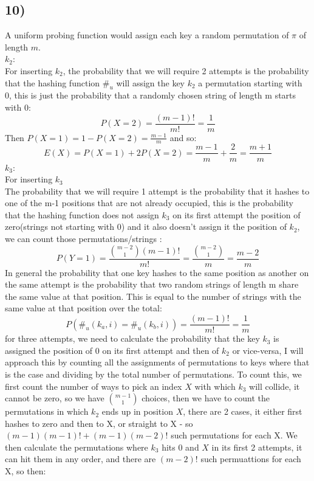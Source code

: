 \documentclass{report}
\begin{document}
\subsection*{10)}
A uniform probing function would assign each key a random permutation of $\pi$ of length $m$.\medskip\\
$k_{2}$:\\
For inserting $k_{2}$, the probability that we will require 2 attempts is the probability that the hashing function $\#_{u}$ will assign the key $k_{2}$ a permutation starting with 0, this is just the probability that a randomly chosen string of length m starts with 0:
\begin{equation*}
    P(X = 2) = \frac{(m-1)!}{m!} = \frac{1}{m}
\end{equation*}
Then $P(X = 1) = 1 - P(X = 2) = \frac{m-1}{m}$ and so:
\begin{equation*}
    E(X) = P(X=1) + 2P(X=2) = \frac{m-1}{m} + \frac{2}{m} = \frac{m+1}{m}
\end{equation*}
$k_{3}$:\\
For inserting $k_{3}$ \\
The probability that we will require 1 attempt is the probability that it hashes to one of the m-1 positions that are  not already occupied, this is the probability that the hashing function does not assign $k_{3}$ on its first attempt the position of zero(strings not starting with 0) and it also doesn't assign it the position of $k_{2}$, we can count those permutations/strings :
\begin{equation*}
    P(Y = 1) = \frac{{m-2 \choose 1}(m-1)!}{m!} = \frac{{m-2 \choose 1}}{m} = \frac{m-2}{m}
\end{equation*}
In general the probability that one key hashes to the same position as another on the same attempt is the probability that two random strings of length m share the same value at that position. This is equal to the number of strings with the same value at that position over the total:
\begin{equation*}
    P(\#_{u}(k_{a},i) = \#_{u}(k_{b},i)) = \frac{(m-1)!}{m!} = \frac{1}{m} 
\end{equation*}
for three attempts, we need to calculate the probability that the key $k_{3}$ is assigned the position of 0 on its first attempt and then of $k_{2}$ or vice-versa, I will approach this by counting all the assignments of permutations to keys where that is the case and dividing by the total number of permutations. To count this, we first count the number of ways to pick an index  $X$ with which $k_{3}$ will collide, it cannot be zero, so we have ${m-1 \choose 1}$ choices, then we have to count the permutations in which $k_{2}$ ends up in position $X$, there are 2 cases, it either first hashes to zero and then to X, or straight to X - so $(m-1)(m-1)! + (m-1)(m-2)!$ such permutations for each X. We then calculate the permutations where $k_{3}$ hits 0 and $X$ in its first 2 attempts, it can hit them in any order, and there are $(m-2)!$ such permuattions for each X, so then: 
\end{document}
